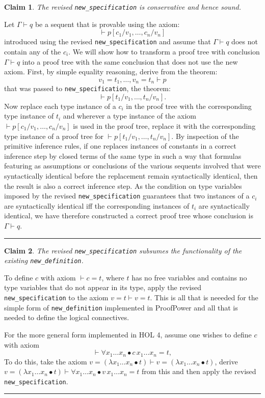 ﻿\documentclass[12pt]{article}
\def\NewDefn{{\tt new\_definition}}
\def\NewSpec{{\tt new\_specification}}
\def\Done{\hfill\rule{0.5em}{0.5em}}
\newtheorem{Claim}{Claim}
\begin{document}
\begin{Claim}\label{clm:conservative}
The revised {\NewSpec} is conservative and hence sound. 
\end{Claim}
Let $\Gamma \vdash q$ be a sequent that is provable using
the axiom:
$$\vdash p[c_1/v_1, \ldots, c_n/v_n]
$$
introduced using the revised {\NewSpec}
and assume that $\Gamma \vdash q$ does not contain any of the $c_i$.
We will show how to transform a proof tree with conclusion $\Gamma \vdash q$ into
a proof tree with the same conclusion that does not use the new axiom.
First, by simple equality reasoning, derive from the theorem:
$$
v_1 = t_1, \ldots, v_n = t_n \vdash p
$$
\noindent that was passed to {\NewSpec},
the theorem:
$$
\vdash p[t_1/v_1, \ldots, t_n/v_n].
$$
\noindent Now replace each type instance of a $c_i$ in the proof tree with the corresponding type instance
of $t_i$ and wherever a type instance of the axiom 
$\vdash p[c_1/v_1, \ldots, c_n/v_n]$ is used in the proof tree, replace it with the
corresponding type instance of a proof tree for $\vdash p[t_1/v_1, \ldots, t_n/v_n]$.
By inspection of the primitive inference rules, if one replaces instances of constants in a correct inference step by closed terms of the same type in such a way that formulas featuring as assumptions or conclusions of the various sequents involved that were syntactically identical before the replacement remain syntactically identical, then the result is also a correct inference step.
As the condition on type variables imposed by the revised
{\NewSpec} guarantees that two instances of a $c_i$ are syntactically identical iff the corresponding instances
of $t_i$ are syntactically identical, we have therefore constructed a correct proof tree whose conclusion is $\Gamma \vdash q$.
\Done

\begin{Claim}\label{clm:new-defn}
The revised {\NewSpec} subsumes the functionality of the existing {\NewDefn}.
\end{Claim}
To define $c$ with axiom $\vdash c = t$, where $t$ has no free variables and contains no type variables that do not appear in its type, apply the revised {\NewSpec}
to the axiom $v = t \vdash v = t$. This is all that is neeeded for the simple form of {\NewDefn} implemented in {\sf ProofPower} and all that is needed to define the logical connectives.

For the more general form implemented in HOL 4, assume one wishes
to define $c$ with axiom
$$
\vdash \forall x_1 \ldots x_n\bullet c\,x_1\ldots x_n = t,
$$
\noindent To do this, take the axiom $v = (\lambda x_1 \ldots x_n\bullet t) \vdash v = (\lambda x_1 \ldots x_n\bullet t)$,
derive $v = (\lambda x_1 \ldots x_n\bullet t) \vdash \forall x_1 \ldots x_n\bullet v\,x_1\ldots x_n = t$
from this and then apply the revised {\NewSpec}. \Done
\end{document}
